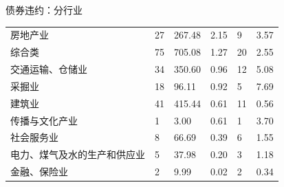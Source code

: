 \begin{frame}{债券违约：分行业}
\begin{table}[]
{\begin{tabular}{llllll}
				房地产业                          & 27                                        & 267.48                                          & 2.15                                        & 9                                           & 3.57                                                \\
				综合类                            & 75                                        & 705.08                                          & 1.27                                        & 20                                          & 2.55                                                \\
				交通运输、仓储业                  & 34                                        & 350.60                                          & 0.96                                        & 12                                          & 5.08                                                \\
				采掘业                            & 18                                        & 96.11                                           & 0.92                                        & 5                                           & 7.69                                                \\
				建筑业                            & 41                                        & 415.44                                          & 0.61                                        & 11                                          & 0.56                                                \\
				传播与文化产业                    & 1                                         & 3.00                                            & 0.61                                        & 1                                           & 3.70                                                \\
				社会服务业                        & 8                                         & 66.69                                           & 0.39                                        & 6                                           & 1.55                                                \\
				电力、煤气及水的生产和供应业      & 5                                         & 37.98                                           & 0.20                                        & 3                                           & 1.18                                                \\
				金融、保险业                      & 2                                         & 9.99                                            & 0.02                                        & 2                                           & 0.34                                                \\

\end{tabular}}
\end{table}
\end{frame}
